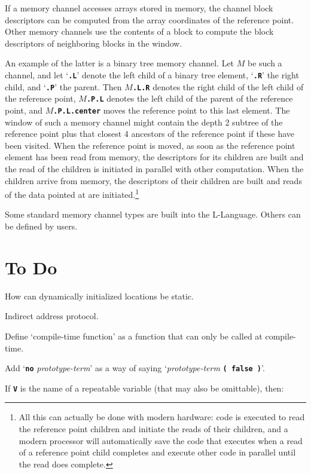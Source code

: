 \documentclass[12pt]{article}
\newcommand{\TT}[1]{{\tt \bfseries #1}}
\begin{document}
If a memory channel accesses arrays stored in memory,
the channel block descriptors can be computed from the array coordinates
of the reference point.  Other memory channels use the contents
of a block to compute the block descriptors of neighboring blocks
in the window.

An example of the latter is a binary tree memory channel.
Let $M$ be such a channel, and let `\TT{.L}' denote the left
child of a binary tree element, `\TT{.R}' the right child, and
`\TT{.P}' the parent.  Then $M\!$\TT{.L.R} denotes the right
child of the left child of the reference point, $M\!$\TT{.P.L}
denotes the left child of the parent of the reference point,
and $M\!$\TT{.P.L.center} moves the reference point to this last element.
The window of such a memory channel might contain the depth 2
subtree of the reference point plus that closest 4 ancestors of the
reference point if these have been visited.  When the reference
point is moved, as soon as the reference point element has been
read from memory, the descriptors for its children are built and
the read of the children is initiated in parallel with other
computation.  When the children arrive from memory, the descriptors
of their children are built and reads of the data pointed at
are initiated.\footnote{All this can actually be done with modern
hardware: code is executed to read the reference point children and initiate the
reads of their children, and a modern processor will automatically
save the code that
executes when a read of a reference point child completes and execute
other code in parallel until the read does complete.}

Some standard memory channel types are built into the L-Language.
Others can be defined by users.

\section{To Do}

How can dynamically initialized locations be static.

Indirect address protocol.

Define `compile-time function' as a function that can only be
called at compile-time.

Add `\TT{no} {\em prototype-term}' as a way of saying
`{\em prototype-term} \TT{( false )}'.

If \TT{V} is the name of a repeatable variable (that may also
be omittable), then:
\end{document}
